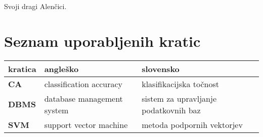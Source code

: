 \documentclass[a4paper, 12pt]{book}
\newcommand{\clearemptydoublepage}{\newpage{\pagestyle{empty}\cleardoublepage}}
\begin{document}
\clearemptydoublepage

\thispagestyle{empty}\mbox{}{\textheight}\mbox{}\hfill\begin{minipage}{0.55\textwidth}%
Svoji dragi Alenčici.
\normalfont\end{minipage}

\clearemptydoublepage


\pagestyle{empty}
\def\thepage{}%
\tableofcontents{}


\clearemptydoublepage


\chapter*{Seznam uporabljenih kratic}  %

\begin{comment}
\begin{tabular}{l|l|l}
  {\bf kratica} & {\bf angleško} & {\bf slovensko} \\ \hline
  {\bf CA} & classification accuracy & klasifikacijska točnost \\
  {\bf DBMS} & database management system & sistem za upravljanje podatkovnih baz \\
  {\bf SVM} & support vector machine & metoda podpornih vektorjev \\
  \dots & \dots & \dots \\
\end{tabular}
\end{comment}

\noindent\begin{tabular}{p{}|p{}|p{}}    %
  {\bf kratica} & {\bf angleško}                             & {\bf slovensko} \\ \hline
  {\bf CA}      & classification accuracy               & klasifikacijska točnost \\
  {\bf DBMS} & database management system & sistem za upravljanje podatkovnih baz \\
  {\bf SVM}   & support vector machine              & metoda podpornih vektorjev \\
\end{tabular}
\end{document}
